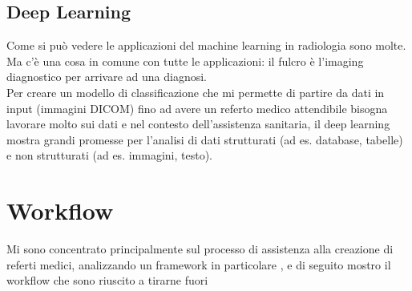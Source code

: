 \documentclass[12pt,a4paper]{report}
\begin{document}
\subsection{Deep Learning}
Come si può vedere le applicazioni del machine learning in radiologia sono molte. Ma c’è una cosa in comune con tutte le applicazioni: il fulcro è l’imaging diagnostico per arrivare ad una diagnosi.\\
Per creare un modello di classificazione che mi permette di partire da dati in input (immagini DICOM) fino ad avere un referto medico attendibile bisogna lavorare molto sui dati e nel contesto dell'assistenza sanitaria, il deep learning mostra grandi promesse per l'analisi di dati strutturati (ad es. database, tabelle) e non strutturati (ad es. immagini, testo).


\section{Workflow}
Mi sono concentrato principalmente sul processo di assistenza alla creazione di referti medici, analizzando un framework in particolare \cite{singh2019chest}, e di seguito mostro il workflow che sono riuscito a tirarne fuori
\end{document}

